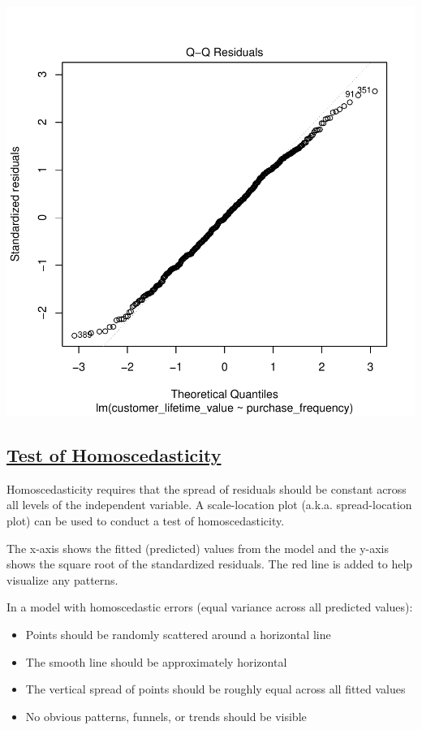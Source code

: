 \documentclass[
]{article}
\begin{document}
\includegraphics{1_simple_linear_regression_files/figure-latex/test_of_normality-1.pdf}

\subsection{\texorpdfstring{\ul{\textbf{Test of
Homoscedasticity}}}{Test of Homoscedasticity}}\label{test-of-homoscedasticity}

Homoscedasticity requires that the spread of residuals should be
constant across all levels of the independent variable. A scale-location
plot (a.k.a. spread-location plot) can be used to conduct a test of
homoscedasticity.

The x-axis shows the fitted (predicted) values from the model and the
y-axis shows the square root of the standardized residuals. The red line
is added to help visualize any patterns.

In a model with homoscedastic errors (equal variance across all
predicted values):

\begin{itemize}
\item
  Points should be randomly scattered around a horizontal line
\item
  The smooth line should be approximately horizontal
\item
  The vertical spread of points should be roughly equal across all
  fitted values
\item
  No obvious patterns, funnels, or trends should be visible
\end{itemize}
\end{document}
